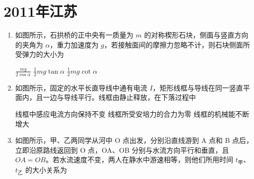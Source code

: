 \documentclass[\gkver]{gaokaozhenti}
\begin{document}
\chapter{2011年江苏}

\begin{enumerate}
\item
如图所示，石拱桥的正中央有一质量为 $m$ 的对称楔形石块，侧面与竖直方向的夹角为 $\alpha$，重力加速度为 $g$，若接触面间的摩擦力忽略不计，则石块侧面所受弹力的大小为


{$\frac{mg}{2\cos\alpha}$}
{$\frac{1}{2}mg\tan\alpha$}
{$\frac{1}{2}mg\cot\alpha$}


\item
如图所示，固定的水平长直导线中通有电流 $I$，矩形线框与导线在同一竖直平面内，且一边与导线平行。线框由静止释放，在下落过程中


{线框中感应电流方向保持不变}
{线框所受安培力的合力为零}
{线框的机械能不断增大}


\item
如图所示，甲、乙两同学从河中 O 点出发，分别沿直线游到 A 点和 B 点后，立即沿原路线返回到 O 点，OA、OB 分别与水流方向平行和垂直，且 $OA=OB$。若水流速度不变，两人在静水中游速相等，则他们所用时间 $t_{\text{甲}}$、$t_{\text{乙}}$ 的大小关系为


\end{enumerate}
\end{document}
